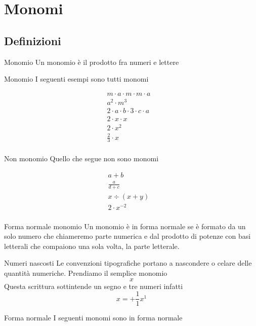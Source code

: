 \chapter{Monomi}
\label{cha:monomi}
\section{Definizioni}
\begin{definizionet}{Monomio}{}
	Un monomio è il prodotto fra numeri e lettere
\end{definizionet}
\begin{esempiot}{Monomio}{}
I seguenti esempi sono tutti monomi
\end{esempiot}
\begin{align*}
	m\cdot a\cdot m\cdot m\cdot a&\\
	a^2\cdot m^3&\\
	2\cdot a\cdot b\cdot3\cdot c\cdot a&\\
	2\cdot x\cdot x&\\
		2\cdot x^2&\\
		\frac{2}{3}\cdot x&\\
\end{align*}
\begin{esempiot}{Non monomio}{}
Quello che segue  non sono monomi
\end{esempiot}
\begin{align*}
a+b&\\
\frac{a}{d+c}&\\
x\div(x+y)&\\
		2\cdot x^{-2}&\\
\end{align*}
\begin{definizionet}{Forma normale monomio}{}
Un monomio è  in forma normale se è formato da un solo numero che chiameremo parte numerica e dal prodotto di potenze con basi letterali che compaiono una sola volta, la parte letterale.
\end{definizionet}
\begin{osservazionet}{Numeri nascosti}{}
	Le convenzioni tipografiche portano a nascondere o celare delle quantità numeriche. Prendiamo il semplice monomio \[x\]Questa  scrittura sottintende un segno e tre numeri infatti
	\[x=+\dfrac{1}{1}x^1\] 
\end{osservazionet}
\begin{esempiot}{Forma normale}{}
	I seguenti monomi sono in forma normale
\end{esempiot}
